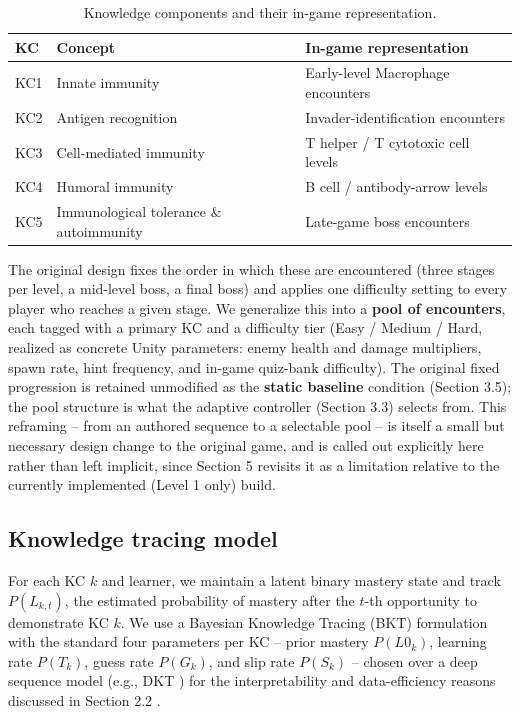 \documentclass[11pt]{article}
\begin{document}
\begin{table}[h]
\centering
\caption{Knowledge components and their in-game representation.}
\label{tab:kcmap}
\begin{tabular}{@{}lll@{}}
\toprule
KC & Concept & In-game representation \\
\midrule
KC1 & Innate immunity & Early-level Macrophage encounters \\
KC2 & Antigen recognition & Invader-identification encounters \\
KC3 & Cell-mediated immunity & T helper / T cytotoxic cell levels \\
KC4 & Humoral immunity & B cell / antibody-arrow levels \\
KC5 & Immunological tolerance \& autoimmunity & Late-game boss encounters \\
\bottomrule
\end{tabular}
\end{table}

The original design fixes the order in which these are encountered (three stages per level, a mid-level boss, a final boss) and applies one difficulty setting to every player who reaches a given stage. We generalize this into a \textbf{pool of encounters}, each tagged with a primary KC and a difficulty tier (Easy / Medium / Hard, realized as concrete Unity parameters: enemy health and damage multipliers, spawn rate, hint frequency, and in-game quiz-bank difficulty). The original fixed progression is retained unmodified as the \textbf{static baseline} condition (Section 3.5); the pool structure is what the adaptive controller (Section 3.3) selects from. This reframing -- from an authored sequence to a selectable pool -- is itself a small but necessary design change to the original game, and is called out explicitly here rather than left implicit, since Section 5 revisits it as a limitation relative to the currently implemented (Level 1 only) build.

\subsection{Knowledge tracing model}

For each KC $k$ and learner, we maintain a latent binary mastery state and track $P(L_{k,t})$, the estimated probability of mastery after the $t$-th opportunity to demonstrate KC $k$. We use a Bayesian Knowledge Tracing (BKT) formulation \cite{ref16} with the standard four parameters per KC -- prior mastery $P(L0_k)$, learning rate $P(T_k)$, guess rate $P(G_k)$, and slip rate $P(S_k)$ -- chosen over a deep sequence model (e.g., DKT \cite{ref18}) for the interpretability and data-efficiency reasons discussed in Section 2.2 \cite{ref19}.
\end{document}
